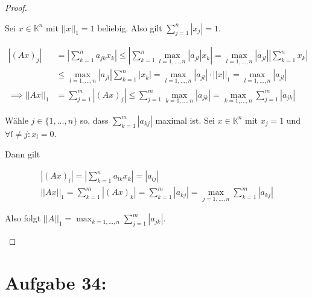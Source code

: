 \documentclass[]{article}
\newcommand{\norm}[1]{\left|\left|#1\right|\right|}
\newcommand{\normone}[1]{\norm{#1}_1}
\newcommand{\maxz}[2]{\max_{#1=1,...,#2}}
\begin{document}
\begin{proof}
\begin{enumerate}[label=\alph*)]
		Sei $x\in\mathbb{K}^n$ mit $\normone{x}=1$ beliebig. Also gilt $\sum_{j=1}^{n}|x_j|=1$.
		
		\begin{align*}
			|(Ax)_j| &= \left|\sum_{k=1}^{n}a_{jk}x_k\right| \leq \left|\sum_{k=1}^{n}\maxz{l}{n}|a_{jl}|x_k\right| = \maxz{l}{n}|a_{jl}|\left|\sum_{k=1}^{n}x_k\right| \\  &\leq\maxz{l}{n}|a_{jl}|\sum_{k=1}^{n}|x_k| = \maxz{l}{n}|a_{jl}| \cdot \normone{x}
			= \maxz{l}{n}|a_{jl}| \\
			\implies \normone{Ax} &= \sum_{j=1}^{m}|(Ax)_j| \leq \sum_{j=1}^{m}\maxz{k}{n}|a_{jk}| = \maxz{k}{n}\sum_{j=1}^{m}|a_{jk}|
		\end{align*}
		
		Wähle $j\in\{1, ..., n\}$ so, dass $\sum_{k=1}^{m}|a_{kj}|$ maximal ist. Sei $x\in\mathbb{K}^n$ mit $x_j=1$ und $\forall l\neq j: x_l=0$.
		
		Dann gilt
		
		\begin{align*}
			|(Ax)_l| = \left|\sum_{k=1}^{n}a_{lk}x_k\right| = |a_{lj}| \\
			\normone{Ax} = \sum_{k=1}^{m}|(Ax)_k| = \sum_{k=1}^{m}|a_{kj}| = \maxz{j}{n} \sum_{k=1}^{m}|a_{kj}|
		\end{align*}
		
		Also folgt $\normone{A} = \maxz{k}{n}\sum_{j=1}^{m}|a_{jk}|$.
	\end{enumerate}
	
\end{proof}

\newpage

\section{Aufgabe 34:}
\end{document}
